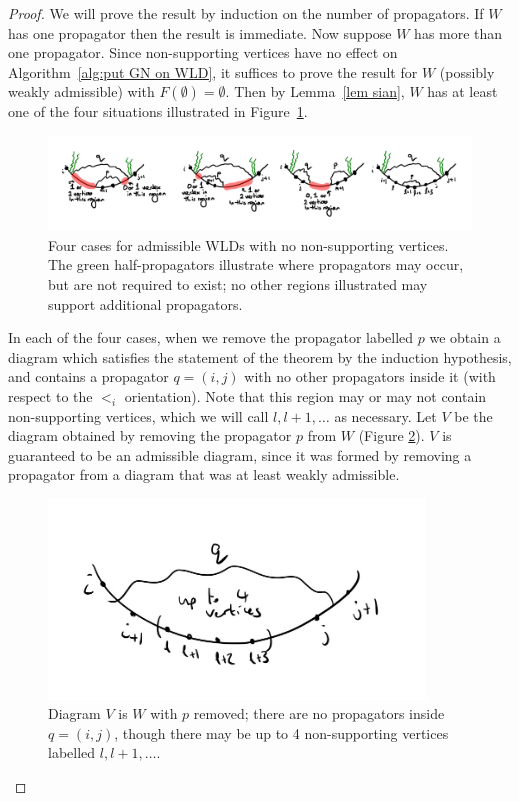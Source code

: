 \documentclass[11pt]{article}
\theoremstyle{remark}
\theoremstyle{definition}
\begin{document}
\begin{proof}
We will prove the result by induction on the number of propagators.  If $W$ has one propagator then the result is immediate.  Now suppose $W$ has more than one propagator.  Since non-supporting vertices have no effect on Algorithm~\ref{alg:put GN on WLD}, it suffices to prove the result for $W$  (possibly weakly admissible) with $F(\emptyset) = \emptyset$.  Then by Lemma~\ref{lem sian}, $W$ has at least one of the four situations illustrated in Figure~\ref{fig 3 cases}.

\begin{figure}
    \includegraphics[scale=0.8]{3cases}
    \caption{Four cases for admissible WLDs with no non-supporting vertices. The green half-propagators illustrate where propagators may occur, but are not required to exist; no other regions illustrated may support additional propagators.}\label{fig 3 cases}
  \end{figure}


In each of the four cases, when we remove the propagator labelled $p$ we obtain a diagram which satisfies the statement of the theorem by the induction hypothesis, and contains a propagator ${q = (i,j)}$ with no other propagators inside it (with respect to the $<_i$ orientation). Note that this region may or may not contain non-supporting vertices, which we will call $l, l+1, \ldots$ as necessary. Let $V$ be the diagram obtained by removing the propagator $p$ from $W$ (Figure \ref{fig V diagram}). $V$ is guaranteed to be an admissible diagram, since it was formed by removing a propagator from a diagram that was at least weakly admissible.


\begin{figure}
\includegraphics[width=10cm]{V_diagram}
\caption{Diagram $V$ is $W$ with $p$ removed; there are no propagators inside $q = (i,j)$, though there may be up to 4 non-supporting vertices labelled $l, l+1, \ldots$.}
\label{fig V diagram}
\end{figure}



\end{proof}
\end{document}

